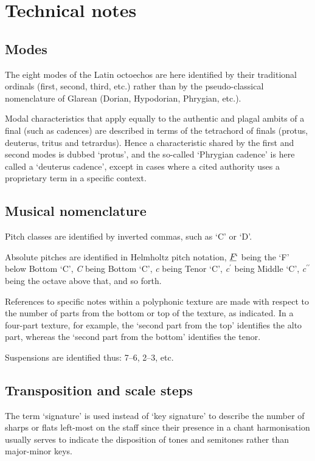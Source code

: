 \chapter{Technical notes}


\section*{Modes}
The eight modes of the Latin octoechos are here identified by their traditional ordinals (first, second, third, etc.) rather than by the pseudo-classical nomenclature of Glarean (Dorian, Hypodorian, Phrygian, etc.).

Modal characteristics that apply equally to the authentic and plagal ambits of a final (such as cadences) are described in terms of the tetrachord of finals (protus, deuterus, tritus and tetrardus).
Hence a characteristic shared by the first and second modes is dubbed `protus', and the so-called `Phrygian cadence' is here called a `deuterus cadence', except in cases where a cited authority uses a proprietary term in a specific context.

\section*{Musical nomenclature}
Pitch classes are identified by inverted commas, such as `C' or `D'.

Absolute pitches are identified in Helmholtz pitch notation, $\emph{F}\kern -1pt`$ being the `F' below Bottom `C', \emph{C} being Bottom `C', \emph{c} being Tenor `C', \emph{c}$^\prime$ being Middle `C', \emph{c}$^{\prime\prime}$ being the octave above that, and so forth.

References to specific notes within a polyphonic texture are made with respect to the number of parts from the bottom or top of the texture, as indicated. In a four-part texture, for example, the `second part from the top' identifies the alto part, whereas the `second part from the bottom' identifies the tenor.

Suspensions are identified thus: 7--6, 2--3, etc.

\section*{Transposition and scale steps}
The term `signature' is used instead of `key signature' to describe the number of sharps or flats left-most on the staff since their presence in a chant harmonisation usually serves to indicate the disposition of tones and semitones rather than major-minor keys.

